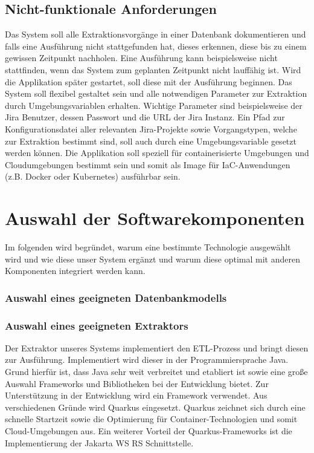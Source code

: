 \documentclass[10pt]{article}
\begin{document}
\subsection{Nicht-funktionale Anforderungen}
Das System soll alle Extraktionsvorgänge in einer Datenbank dokumentieren und falls eine Ausführung nicht stattgefunden hat, dieses erkennen, diese bis zu einem gewissen Zeitpunkt nachholen. Eine Ausführung kann beispielsweise nicht stattfinden, wenn das System zum geplanten Zeitpunkt nicht lauffähig ist. Wird die Applikation später gestartet, soll diese mit der Ausführung beginnen.
Das System soll flexibel gestaltet sein und alle notwendigen Parameter zur Extraktion durch Umgebungsvariablen erhalten. Wichtige Parameter sind beispielsweise der Jira Benutzer, dessen Passwort und die URL der Jira Instanz. Ein Pfad zur Konfigurationsdatei aller relevanten Jira-Projekte sowie Vorgangstypen, welche zur Extraktion bestimmt sind, soll auch durch eine Umgebungsvariable gesetzt werden können.
Die Applikation soll speziell für containerisierte Umgebungen und Cloudumgebungen bestimmt sein und somit als Image für IaC-Anwendungen (z.B. Docker oder Kubernetes) ausführbar sein.
\section{Auswahl der Softwarekomponenten}
Im folgenden wird begründet, warum eine bestimmte Technologie ausgewählt wird und wie diese unser System ergänzt und warum diese optimal mit anderen Komponenten integriert werden kann.
\subsubsection{Auswahl eines geeigneten Datenbankmodells}
\subsubsection{Auswahl eines geeigneten Extraktors}
Der Extraktor unseres Systems implementiert den ETL-Prozess und bringt diesen zur Ausführung. Implementiert wird dieser in der Programmiersprache Java. Grund hierfür ist, dass Java sehr weit verbreitet und etabliert ist sowie eine große Auswahl Frameworks und Bibliotheken bei der Entwicklung bietet. Zur Unterstützung in der Entwicklung wird ein Framework verwendet. Aus verschiedenen Gründe wird Quarkus eingesetzt. Quarkus zeichnet sich durch eine schnelle Startzeit sowie die Optimierung für Container-Technologien und somit Cloud-Umgebungen aus. Ein weiterer Vorteil der Quarkus-Frameworks ist die Implementierung der Jakarta WS RS Schnittstelle.
\end{document}

